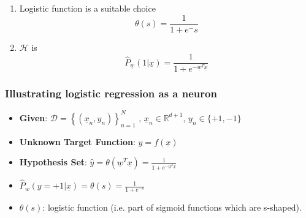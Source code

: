     \begin{derivation}
        \begin{enumerate}
            \item Logistic function is a suitable choice 
            \begin{equation}
                \theta(s) = \frac{1}{1+e^-s} 
            \end{equation}

            \item $\mathcal{H}$ is 
            \begin{equation}
                \hat{P}_{\underline{w}}(1 | \underline{x}) = \frac{1}{1 + e^{-\underline{w}^T \underline{x}}}
            \end{equation}
        \end{enumerate}
    \end{derivation}


    \subsubsection{Illustrating logistic regression as a neuron}
    \begin{definition}
        \begin{itemize}
            \item \textbf{Given}: $\mathcal{D} = \left\{ \left( \underline{x}_n, y_n \right) \right\}_{n=1}^{N}$ , $\underline{x}_n \in \mathbb{R}^{d+1}$, $y_n \in \{+1, -1\}$
            \item \textbf{Unknown Target Function}: $y = f(\underline{x})$
            \item \textbf{Hypothesis Set}: $\hat{y} = \theta\left( \underline{w}^T \underline{x} \right) = \frac{1}{1 + e^{-\underline{w}^T \underline{x}}}$
            \item $\hat{P}_w(y = +1| \underline{x}) = \theta(s) = \frac{1}{1 + e^{-s}}$
            \item $\theta(s)$: logistic function (i.e. part of sigmoid functions which are s-shaped).
        \end{itemize}
    \end{definition}

